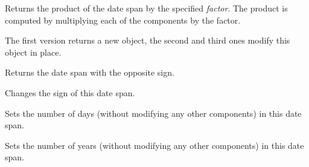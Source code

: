 





Returns the product of the date span by the specified {\it factor}. The
product is computed by multiplying each of the components by the factor.

The first version returns a new object, the second and third ones modify this
object in place.



Returns the date span with the opposite sign.






Changes the sign of this date span.





Sets the number of days (without modifying any other components) in this date
span.



Sets the number of years (without modifying any other components) in this date
span.



